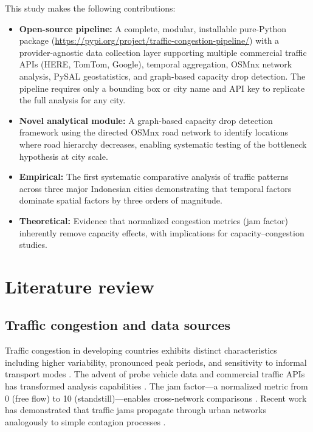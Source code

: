 \documentclass[preprint,12pt,authoryear]{elsarticle}
\begin{document}
This study makes the following contributions:

\begin{itemize}
\item \textbf{Open-source pipeline:} A complete, modular, installable pure-Python package (\url{https://pypi.org/project/traffic-congestion-pipeline/}) with a provider-agnostic data collection layer supporting multiple commercial traffic APIs (HERE, TomTom, Google), temporal aggregation, OSMnx network analysis, PySAL geostatistics, and graph-based capacity drop detection. The pipeline requires only a bounding box or city name and API key to replicate the full analysis for any city.
\item \textbf{Novel analytical module:} A graph-based capacity drop detection framework using the directed OSMnx road network to identify locations where road hierarchy decreases, enabling systematic testing of the bottleneck hypothesis at city scale.
\item \textbf{Empirical:} The first systematic comparative analysis of traffic patterns across three major Indonesian cities demonstrating that temporal factors dominate spatial factors by three orders of magnitude.
\item \textbf{Theoretical:} Evidence that normalized congestion metrics (jam factor) inherently remove capacity effects, with implications for capacity--congestion studies.
\end{itemize}


\section{Literature review}
\label{sec:litreview}

\subsection{Traffic congestion and data sources}

Traffic congestion in developing countries exhibits distinct characteristics including higher variability, pronounced peak periods, and sensitivity to informal transport modes \citep{Gakenheimer1999,Cervero2013}. The advent of probe vehicle data and commercial traffic APIs has transformed analysis capabilities \citep{Leduc2008,Jenelius2015}. The jam factor---a normalized metric from 0 (free flow) to 10 (standstill)---enables cross-network comparisons \citep{HERE2023}. Recent work has demonstrated that traffic jams propagate through urban networks analogously to simple contagion processes \citep{Saberi2020}.
\end{document}
